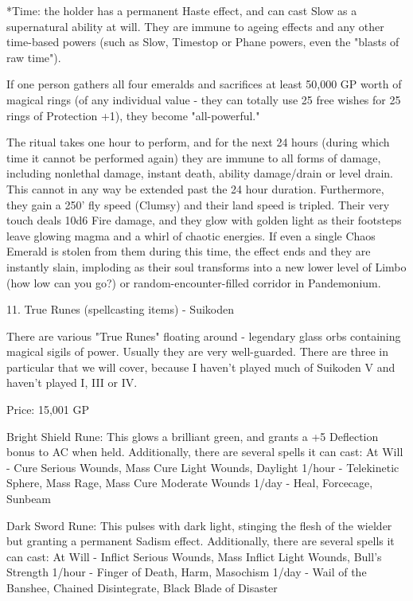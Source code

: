 \begin{multicols}{2}
*Time: the holder has a permanent Haste effect, and can cast Slow as a supernatural ability at will. They are immune to ageing effects and any other time-based powers (such as Slow, Timestop or Phane powers, even the "blasts of raw time").

If one person gathers all four emeralds and sacrifices at least 50,000 GP worth of magical rings (of any individual value - they can totally use 25 free wishes for 25 rings of Protection +1), they become "all-powerful."

The ritual takes one hour to perform, and for the next 24 hours (during which time it cannot be performed again) they are immune to all forms of damage, including nonlethal damage, instant death, ability damage/drain or level drain. This cannot in any way be extended past the 24 hour duration. Furthermore, they gain a 250' fly speed (Clumsy) and their land speed is tripled. Their very touch deals 10d6 Fire damage, and they glow with golden light as their footsteps leave glowing magma and a whirl of chaotic energies. If even a single Chaos Emerald is stolen from them during this time, the effect ends and they are instantly slain, imploding as their soul transforms into a new lower level of Limbo (how low can you go?) or random-encounter-filled corridor in Pandemonium.



11. True Runes (spellcasting items) - Suikoden

There are various "True Runes" floating around - legendary glass orbs containing magical sigils of power. Usually they are very well-guarded. There are three in particular that we will cover, because I haven't played much of Suikoden V and haven't played I, III or IV.

Price: 15,001 GP

Bright Shield Rune: This glows a brilliant green, and grants a +5 Deflection bonus to AC when held. Additionally, there are several spells it can cast:
At Will - Cure Serious Wounds, Mass Cure Light Wounds, Daylight
1/hour - Telekinetic Sphere, Mass Rage, Mass Cure Moderate Wounds
1/day - Heal, Forcecage, Sunbeam

Dark Sword Rune: This pulses with dark light, stinging the flesh of the wielder but granting a permanent Sadism effect. Additionally, there are several spells it can cast:
At Will - Inflict Serious Wounds, Mass Inflict Light Wounds, Bull's Strength
1/hour - Finger of Death, Harm, Masochism
1/day - Wail of the Banshee, Chained Disintegrate, Black Blade of Disaster


\end{multicols}

